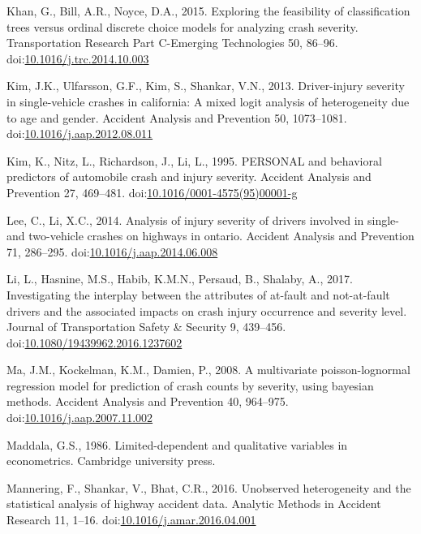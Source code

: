 \documentclass[]{elsarticle} %
\begin{document}
\leavevmode\hypertarget{ref-Khan2015exploring}{}%
Khan, G., Bill, A.R., Noyce, D.A., 2015. Exploring the feasibility of
classification trees versus ordinal discrete choice models for analyzing
crash severity. Transportation Research Part C-Emerging Technologies 50,
86--96.
doi:\href{https://doi.org/10.1016/j.trc.2014.10.003}{10.1016/j.trc.2014.10.003}

\leavevmode\hypertarget{ref-Kim2013driver}{}%
Kim, J.K., Ulfarsson, G.F., Kim, S., Shankar, V.N., 2013. Driver-injury
severity in single-vehicle crashes in california: A mixed logit analysis
of heterogeneity due to age and gender. Accident Analysis and Prevention
50, 1073--1081.
doi:\href{https://doi.org/10.1016/j.aap.2012.08.011}{10.1016/j.aap.2012.08.011}

\leavevmode\hypertarget{ref-Kim1995personal}{}%
Kim, K., Nitz, L., Richardson, J., Li, L., 1995. PERSONAL and behavioral
predictors of automobile crash and injury severity. Accident Analysis
and Prevention 27, 469--481.
doi:\href{https://doi.org/10.1016/0001-4575(95)00001-g}{10.1016/0001-4575(95)00001-g}

\leavevmode\hypertarget{ref-Lee2014analysis}{}%
Lee, C., Li, X.C., 2014. Analysis of injury severity of drivers involved
in single- and two-vehicle crashes on highways in ontario. Accident
Analysis and Prevention 71, 286--295.
doi:\href{https://doi.org/10.1016/j.aap.2014.06.008}{10.1016/j.aap.2014.06.008}

\leavevmode\hypertarget{ref-Li2017interplay}{}%
Li, L., Hasnine, M.S., Habib, K.M.N., Persaud, B., Shalaby, A., 2017.
Investigating the interplay between the attributes of at-fault and
not-at-fault drivers and the associated impacts on crash injury
occurrence and severity level. Journal of Transportation Safety \&
Security 9, 439--456.
doi:\href{https://doi.org/10.1080/19439962.2016.1237602}{10.1080/19439962.2016.1237602}

\leavevmode\hypertarget{ref-Ma2008multivariate}{}%
Ma, J.M., Kockelman, K.M., Damien, P., 2008. A multivariate
poisson-lognormal regression model for prediction of crash counts by
severity, using bayesian methods. Accident Analysis and Prevention 40,
964--975.
doi:\href{https://doi.org/10.1016/j.aap.2007.11.002}{10.1016/j.aap.2007.11.002}

\leavevmode\hypertarget{ref-Maddala1986limited}{}%
Maddala, G.S., 1986. Limited-dependent and qualitative variables in
econometrics. Cambridge university press.

\leavevmode\hypertarget{ref-Mannering2016unobserved}{}%
Mannering, F., Shankar, V., Bhat, C.R., 2016. Unobserved heterogeneity
and the statistical analysis of highway accident data. Analytic Methods
in Accident Research 11, 1--16.
doi:\href{https://doi.org/10.1016/j.amar.2016.04.001}{10.1016/j.amar.2016.04.001}
\end{document}

